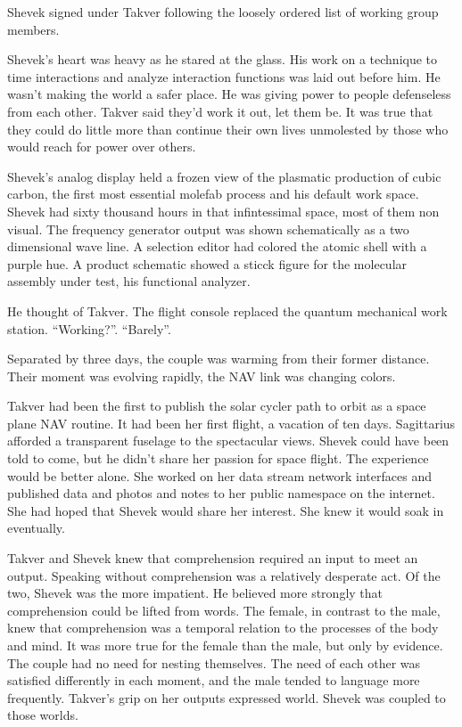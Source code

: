 Shevek signed under Takver following the loosely ordered list of
working group members.

Shevek's heart was heavy as he stared at the glass.  His work on a
technique to time interactions and analyze interaction functions was
laid out before him.  He wasn't making the world a safer place.  He
was giving power to people defenseless from each other.  Takver said
they'd work it out, let them be.  It was true that they could do
little more than continue their own lives unmolested by those who
would reach for power over others.

Shevek's analog display held a frozen view of the plasmatic production
of cubic carbon, the first most essential molefab process and his
default work space.  Shevek had sixty thousand hours in that
infintessimal space, most of them non visual.  The frequency generator
output was shown schematically as a two dimensional wave line.  A
selection editor had colored the atomic shell with a purple hue.  A
product schematic showed a sticck figure for the molecular assembly
under test, his functional analyzer.

He thought of Takver.  The flight console replaced the quantum
mechanical work station.  ``Working?''.  ``Barely''.

Separated by three days, the couple was warming from their former
distance.  Their moment was evolving rapidly, the NAV link was
changing colors.

Takver had been the first to publish the solar cycler path to orbit as
a space plane NAV routine.  It had been her first flight, a vacation
of ten days.  Sagittarius afforded a transparent fuselage to the
spectacular views.  Shevek could have been told to come, but he didn't
share her passion for space flight.  The experience would be better
alone.  She worked on her data stream network interfaces and published
data and photos and notes to her public namespace on the internet.
She had hoped that Shevek would share her interest.  She knew it would
soak in eventually.

Takver and Shevek knew that comprehension required an input to meet an
output.  Speaking without comprehension was a relatively desperate
act.  Of the two, Shevek was the more impatient.  He believed more
strongly that comprehension could be lifted from words.  The female,
in contrast to the male, knew that comprehension was a temporal
relation to the processes of the body and mind.  It was more true for
the female than the male, but only by evidence.  The couple had no
need for nesting themselves.  The need of each other was satisfied
differently in each moment, and the male tended to language more
frequently.  Takver's grip on her outputs expressed world. Shevek was
coupled to those worlds.


